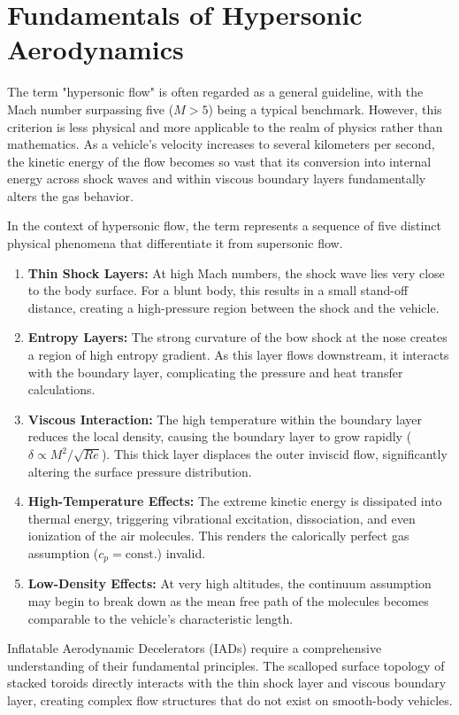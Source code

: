 \section{Fundamentals of Hypersonic Aerodynamics}

\par
The term "hypersonic flow" is often regarded as a general guideline, with the Mach number surpassing five ($M > 5$) being a typical benchmark. However, this criterion is less physical and more applicable to the realm of physics rather than mathematics. As a vehicle's velocity increases to several kilometers per second, the kinetic energy of the flow becomes so vast that its conversion into internal energy across shock waves and within viscous boundary layers fundamentally alters the gas behavior.
\par
In the context of hypersonic flow, the term \cite{AndersonHypersonic}represents a sequence of five distinct physical phenomena that differentiate it from supersonic flow.
\par
\begin{enumerate}
    \item \textbf{Thin Shock Layers:} At high Mach numbers, the shock wave lies very close to the body surface. For a blunt body, this results in a small stand-off distance, creating a high-pressure region between the shock and the vehicle.

    \item \textbf{Entropy Layers:} The strong curvature of the bow shock at the nose creates a region of high entropy gradient. As this layer flows downstream, it interacts with the boundary layer, complicating the pressure and heat transfer calculations.

    \item \textbf{Viscous Interaction:} The high temperature within the boundary layer reduces the local density, causing the boundary layer to grow rapidly ($\delta \propto M^2/\sqrt{Re}$). This thick layer displaces the outer inviscid flow, significantly altering the surface pressure distribution.

    \item \textbf{High-Temperature Effects:} The extreme kinetic energy is dissipated into thermal energy, triggering vibrational excitation, dissociation, and even ionization of the air molecules. This renders the calorically perfect gas assumption ($c_p = \text{const.}$) invalid.

    \item \textbf{Low-Density Effects:} At very high altitudes, the continuum assumption may begin to break down as the mean free path of the molecules becomes comparable to the vehicle's characteristic length.
\end{enumerate}
\par
Inflatable Aerodynamic Decelerators (IADs) require a comprehensive understanding of their fundamental principles. The scalloped surface topology of stacked toroids directly interacts with the thin shock layer and viscous boundary layer, creating complex flow structures that do not exist on smooth-body vehicles.
\par


